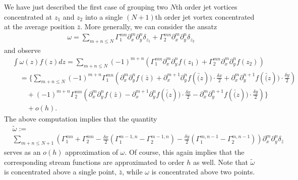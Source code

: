 \documentclass[12pt]{amsart}
\theoremstyle{remark}
\begin{document}
We have just described the first case of grouping two $N$th order jet vortices concentrated at $z_1$ and $z_2$ into a single $(N+1)$th order jet vortex concentrated at 
the average position $\bar{z}$.
More generally, we can consider the ansatz
\begin{align*}
	\omega = \sum_{m+n \leq N} \Gamma_1^{mn} \partial_x^m \partial_y^n \delta_{z_1} + \Gamma_2^{mn} \partial_x^m \partial_y^n \delta_{z_2}
\end{align*}
and observe
\begin{align*}
	&\int \omega(z) f(z)dz = \sum_{m+n \leq N} (-1)^{m+n} \left( \Gamma_1^{mn} \partial_x^m \partial_y^n f(z_1) + \Gamma_2^{mn}  \partial_x^m \partial_y^n f(z_2) \right)\\
		&\quad= \Bigg\{ \sum_{m+n \leq N} (-1)^{m+n} \Gamma_1^{mn} \left( \partial_x^m \partial_y^n  f(\bar{z}) + \partial_x^{m+1} \partial_y^n  f(\bar(z)) \cdot \frac{\delta x}{2} + \partial_x^m \partial_y^{n+1} f(\bar(z)) \cdot \frac{\delta y}{2}  \right)\\
		&\qquad +  (-1)^{m+n} \Gamma_2^{mn} \left( \partial_x^m \partial_y^n  f(\bar{z}) - \partial_x^{m+1} \partial_y^n  f(\bar(z)) \cdot \frac{\delta x}{2} - \partial_x^m \partial_y^{n+1} f(\bar(z)) \cdot \frac{\delta y}{2}  \right) \Bigg\} \\
		&\qquad + o( h ) .
\end{align*}
The above computation implies that the quantity
\begin{align*}
	&\tilde{\omega} :=\\
	 &\sum_{m+n \leq N+1} \left( \Gamma_1^{mn} + \Gamma_2^{mn}
	- \frac{\delta x}{2}( \Gamma_1^{ m-1,n} - \Gamma_2^{m-1,n} ) - \frac{\delta y}{2} ( \Gamma_1^{m,n-1} - \Gamma_2^{m,n-1}) \right) \partial_x^m \partial_y^n \delta_{\bar{z}}
\end{align*}
serves as an $o(h)$ approximation of $\omega$.
Of course, this again implies that the corresponding stream functions are approximated to order $h$ as well.
Note that $\tilde{\omega}$ is concentrated above a single point, $\bar{z}$, while $\omega$ is concentrated above two points.
\end{document}
